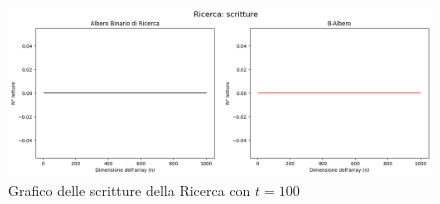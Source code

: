 \begin{figure}[H]
    \centering
    \includegraphics[width=\textwidth]{side-graphs/search-w-t100.png}
    \caption{Grafico delle scritture della Ricerca con $t=100$}
    \label{fig:sidegraphsearchwrite100}
\end{figure}

